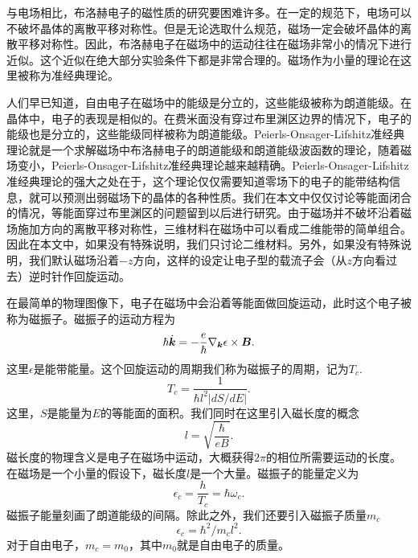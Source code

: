 与电场相比，布洛赫电子的磁性质的研究要困难许多。在一定的规范下，电场可以不破坏晶体的离散平移对称性。但是无论选取什么规范，磁场一定会破坏晶体的离散平移对称性。因此，布洛赫电子在磁场中的运动往往在磁场非常小的情况下进行近似。这个近似在绝大部分实验条件下都是非常合理的。磁场作为小量的理论在这里被称为准经典理论。

人们早已知道，自由电子在磁场中的能级是分立的，这些能级被称为朗道能级。在晶体中，电子的表现是相似的。在费米面没有穿过布里渊区边界的情况下，电子的能级也是分立的，这些能级同样被称为朗道能级。Peierls-Onsager-Lifshitz准经典理论\cite{lifshitz_kosevich,lifshitz_kosevich_jetp}就是一个求解磁场中布洛赫电子的朗道能级和朗道能级波函数的理论，随着磁场变小，Peierls-Onsager-Lifshitz准经典理论越来越精确。Peierls-Onsager-Lifshitz准经典理论的强大之处在于，这个理论仅仅需要知道零场下的电子的能带结构信息，就可以预测出弱磁场下的晶体的各种性质。我们在本文中仅仅讨论等能面闭合的情况，等能面穿过布里渊区的问题留到以后进行研究。由于磁场并不破坏沿着磁场施加方向的离散平移对称性，三维材料在磁场中可以看成二维能带的简单组合。因此在本文中，如果没有特殊说明，我们只讨论二维材料。另外，如果没有特殊说明，我们默认磁场沿着$-z$方向，这样的设定让电子型的载流子会（从$z$方向看过去）逆时针作回旋运动。

在最简单的物理图像下，电子在磁场中会沿着等能面做回旋运动，此时这个电子被称为磁振子。磁振子的运动方程为
\begin{equation}
\hbar\dot{\boldsymbol{k}}=-\frac{e}{\hbar}\nabla_{\boldsymbol{k}}\epsilon\times\boldsymbol{B}.
\end{equation}
这里$\epsilon$是能带能量。这个回旋运动的周期我们称为磁振子的周期，记为$T_c$.
\begin{equation}
T_c=\frac{1}{\hbar l^2 |dS/dE|}.
\end{equation}
这里，$S$是能量为$E$的等能面的面积。我们同时在这里引入磁长度的概念
\begin{equation}
l=\sqrt{\frac{\hbar}{eB}}.
\end{equation}
磁长度的物理含义是电子在磁场中运动，大概获得$2\pi$的相位所需要运动的长度。在磁场是一个小量的假设下，磁长度$l$是一个大量。磁振子的能量定义为
\begin{equation}
\epsilon_c=\frac{h}{T_c}=\hbar \omega_c.
\end{equation}
磁振子能量刻画了朗道能级的间隔。除此之外，我们还要引入磁振子质量$m_c$
\begin{equation}
\epsilon_c = \hbar^2/m_c l^2.
\end{equation}
对于自由电子，$m_c=m_0$，其中$m_0$就是自由电子的质量。


